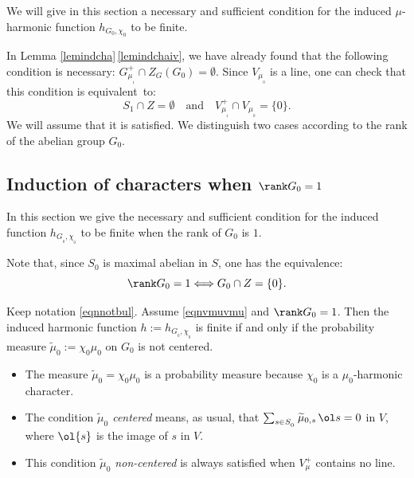 We will give in this section a
necessary and sufficient condition
for the induced $\mu$-harmonic function $h_{G_0,\chi_0}$
to be finite.

In Lemma \ref{lemindcha}\,\eqref{lemindchaiv}, we have already found that the following condition
is necessary: $G_{\mu_{_1}}^+\cap Z_G(G_0)=\emptyset$.
Since $V_{\mu_{_0}}$ is a line, one can check that this condition is equivalent~to:
\begin{equation}
\label{eqnvmuvmu}
S_1\cap Z=\emptyset
\quad\text{and}\quad
V^+_{\mu_{_1}}\cap V_{\mu_{_0}}=\{0\}.
\end{equation}
We will assume that it is satisfied. We distinguish two cases according to the rank of the abelian group $G_0$.

\subsection{Induction of characters when $\rank G_0=1$}
\label{secindhar1}
\bq
In this section we give the necessary and sufficient condition for
the induced function $h_{G_{_0},\chi_{_0}}$ to be finite when the rank of $G_0$ is $1$.
\eq

Note that, since $S_0$ is maximal abelian in $S$,
one has the equivalence:
\[
\rank G_0=1\Longleftrightarrow G_0\cap Z=\{0\}.
\]

\begin{Prop}
\label{proindra1}
Keep notation \eqref{eqnnotbul}. Assume \eqref{eqnvmuvmu} and $\rank G_0=1$.
Then the induced harmonic function $h:=h_{G_{_0},\chi_{_0}}$ is finite if and only if
the probability measure $\widetilde{\mu}_0:=\chi_0\mu_0$ on $G_0$ is not centered.
\end{Prop}

\skpt
\begin{Rem}
\begin{itemize}
\item
The measure $\widetilde{\mu}_0=\chi_0\mu_0$ is a probability measure because
$\chi_0$ is a $\mu_0$-harmonic character.
\item
The condition {\it $\widetilde{\mu}_0$ centered} means, as usual, that
$\sum_{s\in S_{_0}}\widetilde{\mu}_{0,s}\, \ol s =0$ in $V$,
where $\ol{s}$ is the image of $s$ in $V$.
\item
This condition {\it $\widetilde{\mu}_0$ non-centered} is always satisfied
when $V_\mu^+$ contains no line.
\end{itemize}
\end{Rem}

